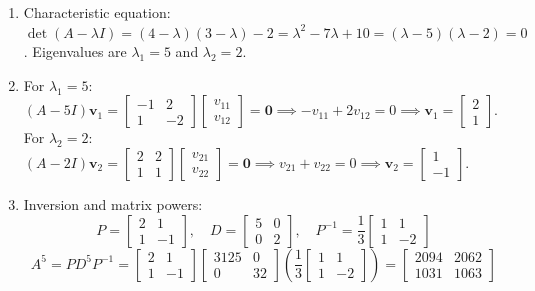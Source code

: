 \begin{enumerate}[label=(\alph*)]
    \item Characteristic equation: $\det(A - \lambda I) = (4 - \lambda)(3 - \lambda) - 2 = \lambda^2 - 7\lambda + 10 = (\lambda - 5)(\lambda - 2) = 0$.
    Eigenvalues are $\lambda_1 = 5$ and $\lambda_2 = 2$.
    \item For $\lambda_1 = 5$: $(A - 5I)\mathbf{v}_1 = \begin{bmatrix} -1 & 2 \\ 1 & -2 \end{bmatrix} \begin{bmatrix} v_{11} \\ v_{12} \end{bmatrix} = \mathbf{0} \implies -v_{11} + 2v_{12} = 0 \implies \mathbf{v}_1 = \begin{bmatrix} 2 \\ 1 \end{bmatrix}$.
    For $\lambda_2 = 2$: $(A - 2I)\mathbf{v}_2 = \begin{bmatrix} 2 & 2 \\ 1 & 1 \end{bmatrix} \begin{bmatrix} v_{21} \\ v_{22} \end{bmatrix} = \mathbf{0} \implies v_{21} + v_{22} = 0 \implies \mathbf{v}_2 = \begin{bmatrix} 1 \\ -1 \end{bmatrix}$.
    \item Inversion and matrix powers:
    \[
    P = \begin{bmatrix} 2 & 1 \\ 1 & -1 \end{bmatrix}, \quad D = \begin{bmatrix} 5 & 0 \\ 0 & 2 \end{bmatrix}, \quad P^{-1} = \frac{1}{3}\begin{bmatrix} 1 & 1 \\ 1 & -2 \end{bmatrix}
    \]
    \[
    A^5 = P D^5 P^{-1} = \begin{bmatrix} 2 & 1 \\ 1 & -1 \end{bmatrix} \begin{bmatrix} 3125 & 0 \\ 0 & 32 \end{bmatrix} \left( \frac{1}{3} \begin{bmatrix} 1 & 1 \\ 1 & -2 \end{bmatrix} \right) = \begin{bmatrix} 2094 & 2062 \\ 1031 & 1063 \end{bmatrix}
    \]
\end{enumerate}

